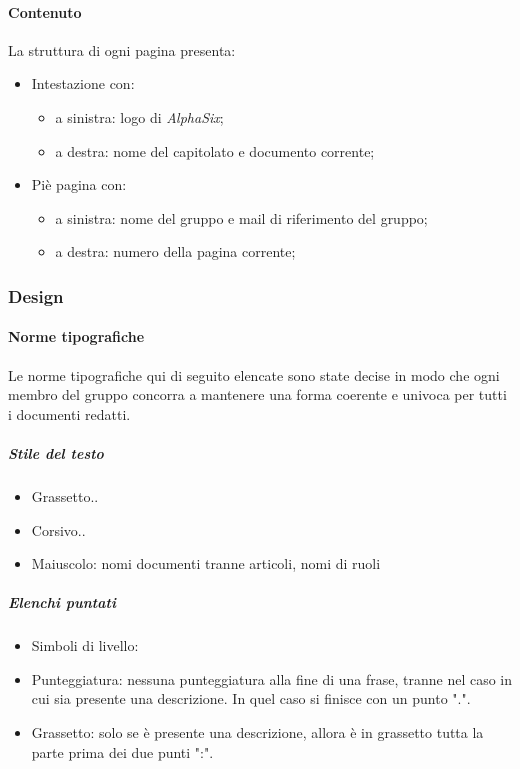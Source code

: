 			\paragraph{Contenuto}\label{PS:Documentazione:Struttura:Contenuto}
			La struttura di ogni pagina presenta:
			\begin{itemize}
				\item Intestazione con:
				\begin{itemize}
					\item a sinistra: logo di \textit{AlphaSix};
					\item a destra: nome del capitolato e documento corrente;
				\end{itemize}
				 \item Piè pagina con:
				 \begin{itemize}
				 	\item a sinistra: nome del gruppo e mail di riferimento del gruppo;
				 	\item a destra: numero della pagina corrente;
				\end{itemize}
			\end{itemize}


		\subsubsection{Design}\label{PS:Documentazione:Design}

			\paragraph{Norme tipografiche}\label{PS:Documentazione:Design:NormeT}
			Le norme tipografiche qui di seguito elencate sono state decise in modo che ogni membro del gruppo concorra a mantenere una forma coerente e univoca per tutti i documenti redatti.

			\subparagraph{Stile del testo}\label{PS:Documentazione:Design:NormeT:StileTesto}
			\begin{itemize}
				\item Grassetto..
				\item Corsivo..
				\item Maiuscolo: nomi documenti tranne articoli, nomi di ruoli
			\end{itemize}

			\subparagraph{Elenchi puntati}\label{PS:Documentazione:Design:NormeT:ElenchiPuntati}
			\begin{itemize}
				\item Simboli di livello:
				\item Punteggiatura: nessuna punteggiatura alla fine di una frase, tranne nel caso in cui sia presente una descrizione. In quel caso si finisce con un punto ".".
				\item Grassetto: solo se è presente una descrizione, allora è in grassetto tutta la parte prima dei due punti ":".
			\end{itemize}

